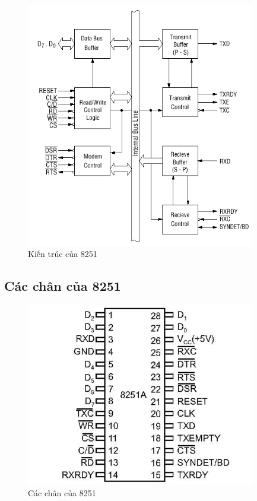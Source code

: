 \documentclass[../report.tex]{subfiles}
\begin{document}
\begin{figure}[H]
\centering
\includegraphics[width=10cm]{figures/8251-usart-architecture.png}
\caption{Kiến trúc của 8251}
\end{figure}

\subsection{Các chân của 8251}
\begin{figure}[H]
\centering
\includegraphics[width=10cm]{figures/8251-usart-pins.png}
\caption{Các chân của 8251}
\end{figure}
\end{document}

